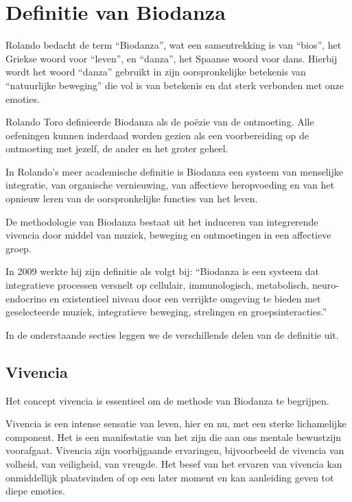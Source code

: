 \documentclass[
  11pt,
]{book}
\begin{document}
\hypertarget{definitie-van-biodanza}{%
\section{Definitie van Biodanza}\label{definitie-van-biodanza}}

Rolando bedacht de term ``Biodanza'', wat een samentrekking is van ``bios'', het Griekse woord voor ``leven'', en ``danza'', het Spaanse woord voor dans. Hierbij wordt het woord ``danza'' gebruikt in zijn oorspronkelijke betekenis van ``natuurlijke beweging'' die vol is van betekenis en dat sterk verbonden met onze emoties.

Rolando Toro definieerde Biodanza als de poëzie van de ontmoeting. Alle oefeningen kunnen inderdaad worden gezien als een voorbereiding op de ontmoeting met jezelf, de ander en het groter geheel.

In Rolando's meer academische definitie is Biodanza een systeem van menselijke integratie, van organische vernieuwing, van affectieve heropvoeding en van het opnieuw leren van de oorspronkelijke functies van het leven.

De methodologie van Biodanza bestaat uit het induceren van integrerende vivencia door middel van muziek, beweging en ontmoetingen in een affectieve groep.

In 2009 werkte hij zijn definitie als volgt bij: ``Biodanza is een systeem dat integratieve processen versnelt op cellulair, immunologisch, metabolisch, neuro-endocrino en existentieel niveau door een verrijkte omgeving te bieden met geselecteerde muziek, integratieve beweging, strelingen en groepsinteracties.''

In de onderstaande secties leggen we de verschillende delen van de definitie uit.

\hypertarget{vivencia}{%
\subsection{Vivencia}\label{vivencia}}

Het concept vivencia is essentieel om de methode van Biodanza te begrijpen.

Vivencia is een intense sensatie van leven, hier en nu, met een sterke lichamelijke component. Het is een manifestatie van het zijn die aan ons mentale bewustzijn voorafgaat. Vivencia zijn voorbijgaande ervaringen, bijvoorbeeld de vivencia van volheid, van veiligheid, van vreugde. Het besef van het ervaren van vivencia kan onmiddellijk plaatsvinden of op een later moment en kan aanleiding geven tot diepe emoties.
\end{document}
